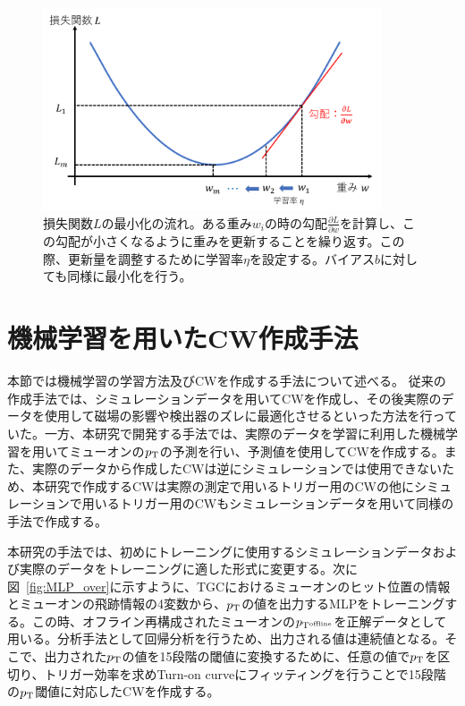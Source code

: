 \begin{figure}[tb]
  \centering
  \includegraphics[clip, width=10cm]{fig/4/lossfunc_laerning.png}
  \caption{損失関数$L$の最小化の流れ。ある重み$w_i$の時の勾配$\frac{\partial L}{\partial w}$を計算し、この勾配が小さくなるように重みを更新することを繰り返す。この際、更新量を調整するために学習率$\eta$を設定する。バイアス$b$に対しても同様に最小化を行う。}
  \label{fig:lossfunction}
\end{figure}



\section{機械学習を用いたCW作成手法}
本節では機械学習の学習方法及びCWを作成する手法について述べる。
従来の作成手法では、シミュレーションデータを用いてCWを作成し、その後実際のデータを使用して磁場の影響や検出器のズレに最適化させるといった方法を行っていた。一方、本研究で開発する手法では、実際のデータを学習に利用した機械学習を用いてミューオンの$p_{\rm{T}}$の予測を行い、予測値を使用してCWを作成する。また、実際のデータから作成したCWは逆にシミュレーションでは使用できないため、本研究で作成するCWは実際の測定で用いるトリガー用のCWの他にシミュレーションで用いるトリガー用のCWもシミュレーションデータを用いて同様の手法で作成する。

本研究の手法では、初めにトレーニングに使用するシミュレーションデータおよび実際のデータをトレーニングに適した形式に変更する。次に図~\ref{fig:MLP_over}に示すように、TGCにおけるミューオンのヒット位置の情報とミューオンの飛跡情報の4変数から、$p_{\rm{T}}$の値を出力するMLPをトレーニングする。この時、オフライン再構成されたミューオンの$p_{\rm{T}^{\rm{offline}}}$を正解データとして用いる。分析手法として回帰分析を行うため、出力される値は連続値となる。そこで、出力された$p_{\rm{T}}$の値を15段階の閾値に変換するために、任意の値で$p_{\rm{T}}$を区切り、トリガー効率を求めTurn-on curveにフィッティングを行うことで15段階の$p_{\rm{T}}$閾値に対応したCWを作成する。

